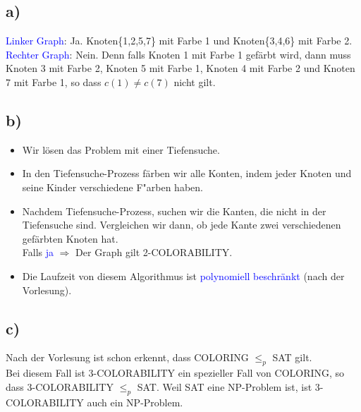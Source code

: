 \documentclass[a4paper,11pt]{scrartcl}
\begin{document}
\subsection*{a)}
\noindent \textcolor{blue}{Linker Graph}: Ja. Knoten\{1,2,5,7\} mit Farbe 1 und Knoten\{3,4,6\} mit Farbe 2.\\
\textcolor{blue}{Rechter Graph}: Nein. Denn falls Knoten 1 mit Farbe 1 gefärbt wird, dann muss Knoten 3 mit Farbe 2, Knoten 5 mit Farbe 1, Knoten 4 mit Farbe 2 und Knoten 7 mit Farbe 1, so dass $c(1)\ne c(7)$ nicht gilt.

\subsection*{b)}
\begin{itemize}
	\item Wir lösen das Problem mit einer Tiefensuche.
	\item In den Tiefensuche-Prozess färben wir alle Konten, indem jeder Knoten und seine Kinder verschiedene F"arben haben.
	\item Nachdem Tiefensuche-Prozess, suchen wir die Kanten, die nicht in der Tiefensuche sind. Vergleichen wir dann, ob jede Kante zwei verschiedenen gefärbten Knoten hat.\\
	Falls \textcolor{blue}{ja} $\Rightarrow$ Der Graph gilt 2-COLORABILITY.
	\item Die Laufzeit  von diesem Algorithmus ist \textcolor{blue}{polynomiell beschränkt} (nach der Vorlesung).
\end{itemize}

\subsection*{c)}
\noindent Nach der Vorlesung ist schon erkennt, dass COLORING $\leq_p$ SAT gilt.\\
Bei diesem Fall ist 3-COLORABILITY ein spezieller Fall von COLORING, so dass 3-COLORABILITY $\leq_p$ SAT. Weil SAT eine NP-Problem ist, ist 3-COLORABILITY auch ein NP-Problem.
\end{document}
